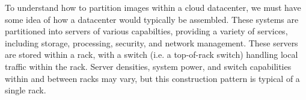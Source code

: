 \documentclass[10pt,letterpaper]{article}
\begin{document}
To understand how to partition images within a cloud datacenter, we must have some idea of how a datacenter would typically be assembled.  These systems are partitioned into servers of various capabilties, providing a variety of services, including storage, processing, security, and network management.  These servers are stored within a rack, with a switch (i.e. a top-of-rack switch) handling local traffic within the rack.  Server densities, system power, and switch capabilities within and between racks may vary, but this construction pattern is typical of a single rack.

%
%
\end{document}

